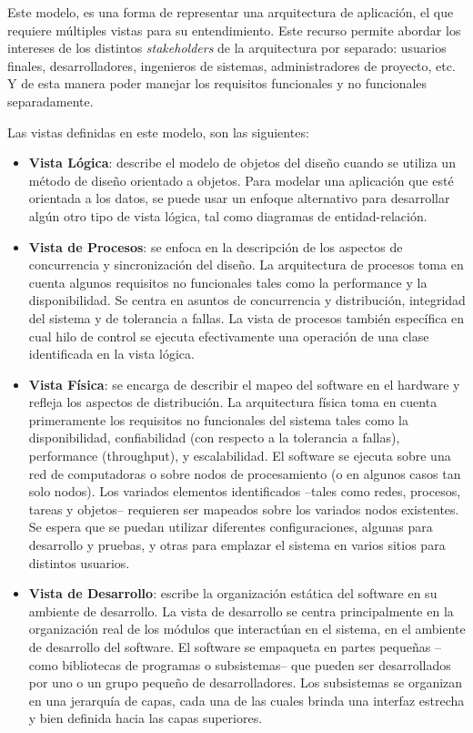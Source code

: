 \documentclass{memoria}
\begin{document}

Este modelo, es una forma de representar una arquitectura de aplicación, el que requiere múltiples vistas para su entendimiento. Este recurso permite abordar los intereses de los distintos \textsl{stakeholders} de la arquitectura por separado: usuarios finales, desarrolladores, ingenieros de sistemas, administradores de proyecto, etc. Y de esta manera poder manejar los requisitos funcionales y no funcionales separadamente.

Las vistas definidas en este modelo, son las siguientes:

\begin{itemize}
\item \textbf{Vista Lógica}: describe el modelo de objetos del diseño cuando se utiliza un método de diseño orientado a objetos. Para modelar una aplicación que esté orientada a los datos, se puede usar un enfoque alternativo para desarrollar algún otro tipo de vista lógica, tal como diagramas de entidad-relación.
\item \textbf{Vista de Procesos}: se enfoca en la descripción de los aspectos de concurrencia y sincronización del diseño. La arquitectura de procesos toma en cuenta algunos requisitos no funcionales tales como la performance y la disponibilidad. Se centra en asuntos de concurrencia y distribución, integridad del sistema y de tolerancia a fallas. La vista de procesos también específica en cual hilo de control se ejecuta efectivamente una operación de una clase identificada en la vista lógica.
\item \textbf{Vista Física}: se encarga de describir el mapeo del software en el hardware y refleja los aspectos de distribución. La arquitectura física toma en cuenta primeramente los requisitos no funcionales del sistema tales como la disponibilidad, confiabilidad (con respecto a la tolerancia a fallas), performance (throughput), y escalabilidad. El software se ejecuta sobre una red de computadoras o sobre nodos de procesamiento (o en algunos casos tan solo nodos). Los variados elementos identificados –tales como redes, procesos, tareas y objetos– requieren ser mapeados sobre los variados nodos existentes. Se espera que se puedan utilizar diferentes configuraciones, algunas para desarrollo y pruebas, y otras para emplazar el sistema en varios sitios para distintos usuarios.
\item \textbf{Vista de Desarrollo}: escribe la organización estática del software en su ambiente de desarrollo. La vista de desarrollo se centra principalmente en la organización real de los módulos que interactúan en el sistema, en el ambiente de desarrollo del software. El software se empaqueta en partes pequeñas –como bibliotecas de programas o subsistemas– que pueden ser desarrollados por uno o un grupo pequeño de desarrolladores. Los subsistemas se organizan en una jerarquía de capas, cada una de las cuales brinda una interfaz estrecha y bien definida hacia las capas superiores.

\end{itemize}
\end{document}
